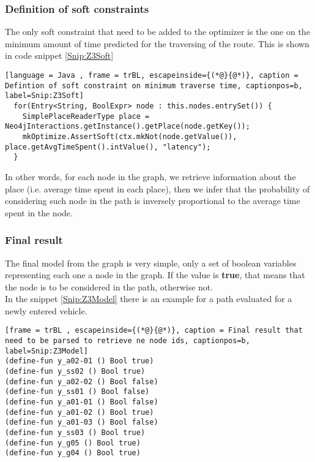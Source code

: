 \subsubsection{Definition of soft constraints}
The only soft constraint that need to be added to the optimizer is the one on the minimum amount of time predicted for the traversing of the route. This is shown in code snippet \ref{Snip:Z3Soft}
\begin{lstlisting}[language = Java , frame = trBL, escapeinside={(*@}{@*)}, caption = Defintion of soft constraint on minimum traverse time, captionpos=b, label=Snip:Z3Soft]
  for(Entry<String, BoolExpr> node : this.nodes.entrySet()) {
    SimplePlaceReaderType place = Neo4jInteractions.getInstance().getPlace(node.getKey());
    mkOptimize.AssertSoft(ctx.mkNot(node.getValue()), place.getAvgTimeSpent().intValue(), "latency");
  }
\end{lstlisting}
In other words, for each node in the graph, we retrieve information about the place (i.e. average time spent in each place), then we infer that the probability of considering such node in the path is inversely proportional to the average time spent in the node.

\subsubsection{Final result}
The final model from the graph is very simple, only a set of boolean variables representing each one a node in the graph. If the value is \textbf{true}, that means that the node is to be considered in the path, otherwise not.\\
In the snippet \ref{Snip:Z3Model} there is an example for a path evaluated for a newly entered vehicle.
\begin{lstlisting}[frame = trBL , escapeinside={(*@}{@*)}, caption = Final result that need to be parsed to retrieve ne node ids, captionpos=b, label=Snip:Z3Model]
(define-fun y_a02-01 () Bool true)
(define-fun y_ss02 () Bool true)
(define-fun y_a02-02 () Bool false)
(define-fun y_ss01 () Bool false)
(define-fun y_a01-01 () Bool false)
(define-fun y_a01-02 () Bool true)
(define-fun y_a01-03 () Bool false)
(define-fun y_ss03 () Bool true)
(define-fun y_g05 () Bool true)
(define-fun y_g04 () Bool true)
\end{lstlisting}

